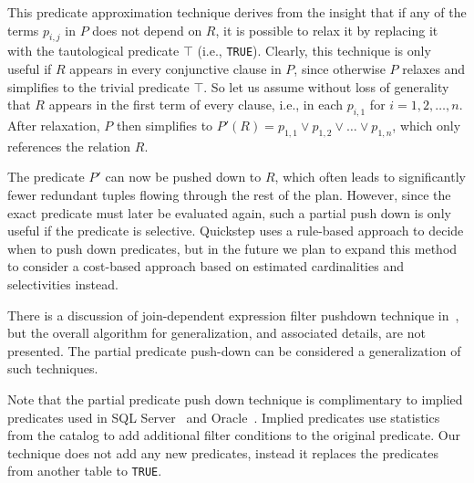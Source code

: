 This predicate approximation technique derives from the insight that if any of the terms $p_{i,j}$ in $P$ does not depend on $R$, it is possible to relax it by replacing it with the tautological predicate $\top$ (i.e., \texttt{TRUE}). Clearly, this technique is only useful if $R$ appears in every conjunctive clause in $P$, since otherwise $P$ relaxes and simplifies to the trivial predicate $\top$. So let us assume without loss of generality that $R$ appears in the first term of every clause, i.e., in each $p_{i,1}$ for $i = 1,2,\ldots,n$. After relaxation, $P$ then simplifies to $P'(R) = p_{1,1} \vee p_{1,2} \vee \ldots \vee p_{1,n}$, which only references the relation $R$.

The predicate $P'$ can now be pushed down to $R$, which often leads to significantly fewer redundant tuples flowing through the rest of the plan. However, since the exact predicate must later be evaluated again, such a partial push down is only useful if the predicate is selective. Quickstep uses a rule-based approach to decide when to push down predicates, but in the future we plan to expand this method to consider a cost-based approach based on estimated cardinalities and selectivities instead.

There is a discussion of join-dependent expression filter pushdown technique in~\cite{BonczNE13}, but the overall algorithm for generalization, and associated details, are not presented. 
The partial predicate push-down can be considered a generalization of such techniques.

Note that the partial predicate push down technique is complimentary to implied predicates used in SQL Server~\cite{sql-server-implied-predicate} and Oracle~\cite{oracle-implied-predicate}.
Implied predicates use statistics from the catalog to add additional filter conditions to the original predicate.
Our technique does not add any new predicates, instead it replaces the predicates from another table to \texttt{TRUE}.



